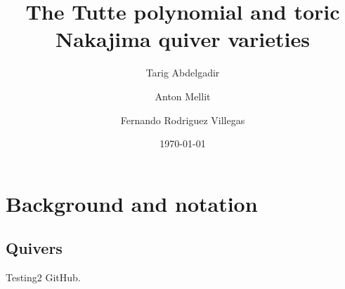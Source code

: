 \documentclass{amsart}
\title{The Tutte polynomial and toric Nakajima quiver varieties}
\author{Tarig Abdelgadir}
\author{Anton Mellit}
\author{Fernando Rodriguez Villegas}
\date{\today}
\theoremstyle{definition}
\begin{document}
\maketitle




\section{Background and notation}
\subsection{Quivers}
Testing2
 GitHub.
\end{document}
